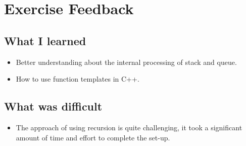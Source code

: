 \documentclass[a4paper, 12pt]{article}
\begin{document}
\section{Exercise Feedback}
\subsection{What I learned}
\begin{flushleft}
\begin{itemize}
    \item Better understanding about the internal processing of stack and queue.
    \item How to use function templates in C++. 
\end{itemize}
\end{flushleft}
\subsection{What was difficult}
\begin{flushleft}
\begin{itemize}
    \item The approach of using recursion is quite challenging, it took a significant amount of time and effort to complete the set-up.
\end{itemize}
\end{flushleft}
\end{document}
